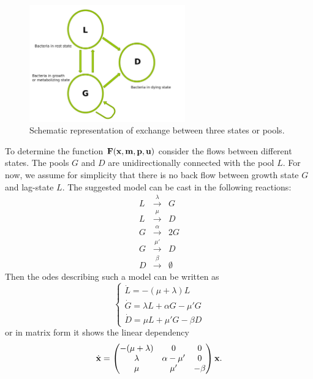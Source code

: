 \documentclass[10pt,A4paper]{article}
\begin{document}
\begin{figure}[t]
    \begin{center}
    \includegraphics[width=0.6\textwidth]{Figures/TPM_fig.pdf}
    \caption{Schematic representation of exchange between three states or pools.}
    \label{fig:SchematicRep}
    \end{center}
\end{figure}
To determine the function $\mathbf{F}(\mathbf{x}, \mathbf{m}, \mathbf{p}, \mathbf{u})$ consider the flows between different states.
The pools $G$ and $D$ are unidirectionally connected with the pool $L$. 
For now, we assume for simplicity that there is no back flow between growth state $G$ and lag-state $L$. 
The suggested model can be cast in the following reactions: 
\begin{eqnarray}
    L &\stackrel{\lambda}{\longrightarrow} & G\\
    L &\stackrel{\mu}{\longrightarrow} & D\\
    G &\stackrel{\alpha}{\longrightarrow} & 2G\\
    G &\stackrel{\mu'}{\longrightarrow} & D\\
    D &\stackrel{\beta}{\longrightarrow} & \emptyset
\end{eqnarray}
Then the \acp{ode} describing such a model can be written as 
\begin{equation}
\begin{cases}
    \dot{L} = -(\mu + \lambda) L\\
    \dot{G} = \lambda L + \alpha G - \mu' G\\
    \dot{D} = \mu  L + \mu' G- \beta D  
\end{cases}
\end{equation}
or in matrix form it shows the linear dependency
\begin{equation}
    \dot {\mathbf{x}}  = \begin{pmatrix}
        -(\mu + \lambda) & 0             & 0      \\
        \lambda          & \alpha - \mu' & 0      \\
        \mu              & \mu'          & -\beta 
    \end{pmatrix} \mathbf{x} .
\end{equation}
%
%
%
\end{document}

